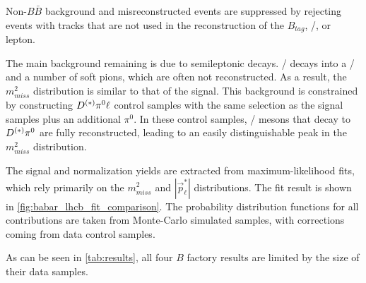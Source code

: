 Non-$B \bar{B}$ background and misreconstructed events are suppressed by
rejecting events with tracks that are not used in the reconstruction of the
$B_{tag}$, \DDst/, or lepton.

The main background remaining is due to semileptonic
\BMesonMode{\ell}{\Dstst/} decays.
\Dstst/ decays into a \Dst/ and a number of soft pions, which are often not
reconstructed.
As a result, the $m^2_{miss}$ distribution is similar to that of the signal.
This background is constrained by constructing $\DDst/ \pi^0 \ell$ control
samples with the same selection as the signal samples plus an additional
$\pi^0$.
In these control samples, \Dstst/ mesons that decay to $\DDst/ \pi^0$ are
fully reconstructed, leading to an easily distinguishable peak in the
$m^2_{miss}$ distribution.

The signal and normalization yields are extracted from maximum-likelihood fits,
which rely primarily on the $m^2_{miss}$ and $|\vec{p}^*_\ell|$ distributions.
The fit result is shown in \autoref{fig:babar_lhcb_fit_comparison}.
The probability distribution functions for all contributions are taken from
Monte-Carlo simulated samples, with corrections coming from data control
samples.

As can be seen in \autoref{tab:results}, all four $B$ factory results are
limited by the size of their data samples.
